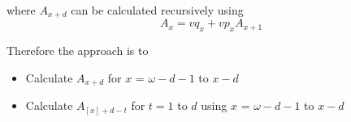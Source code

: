 \documentclass{report}
\begin{document}
where $A_{x+d}$ can be calculated recursively using
\begin{equation}
A_{x} = vq_{x} + vp_{x}A_{x+1}
\end{equation}

Therefore the approach is to 
\begin{itemize}
\item Calculate $A_{x+d}$ for $x$ = $\omega - d - 1$ to $x - d$
\item Calculate $A_{[x]+d-t}$ for $t = 1$ to $d$ using $x$ = $\omega - d - 1$ to $x - d$
\end{itemize}

\end{document}
